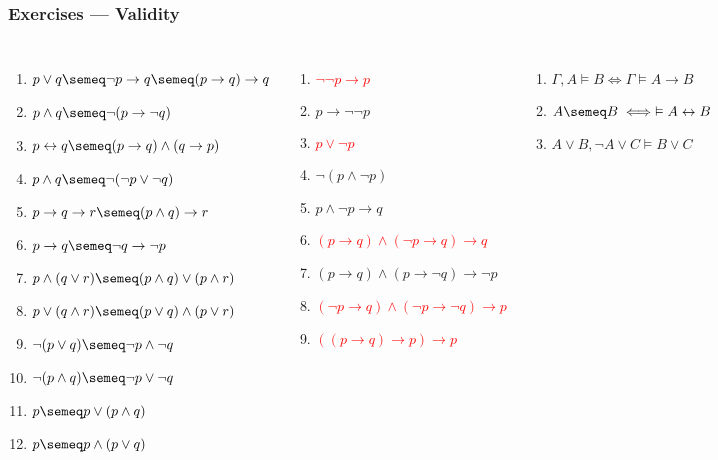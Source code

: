 \documentclass[UTF8,11pt,colorlinks,compress,openany]{beamer}%
\begin{document}
\begin{frame}\frametitle{Exercises --- Validity}
		\begin{columns}
				\begin{enumerate}
					\item \textcolor{green}{$p\vee q\semeq\neg p\to q\semeq(p\to q)\to q$}
					\item \textcolor{green}{$p\wedge q\semeq\neg(p\to\neg q)$}
					\item \textcolor{green}{$p\leftrightarrow q\semeq(p\to q)\wedge(q\to p)$}
					\item $p\wedge q\semeq\neg(\neg p\vee\neg q)$
					\item $p\to q\to r\semeq(p\wedge q)\to r$
					\item $p\to q\semeq\neg q\to\neg p$
					\item $p\wedge(q\vee r)\semeq(p\wedge q)\vee(p\wedge r)$
					\item $p\vee(q\wedge r)\semeq(p\vee q)\wedge(p\vee r)$
					\item $\neg(p\vee q)\semeq\neg p\wedge\neg q$
					\item $\neg(p\wedge q)\semeq\neg p\vee\neg q$
					\item $p\semeq p\vee(p\wedge q)$
					\item $p\semeq p\wedge(p\vee q)$
				\end{enumerate}
				\begin{enumerate}
					\item \textcolor{red}{$\neg\neg p\to p$}
					\item $p\to\neg\neg p$
					\item \textcolor{red}{$p\vee\neg p$}
					\item $\neg(p\wedge\neg p)$
					\item $p\wedge\neg p\to q$
					\item \textcolor{red}{$(p\to q)\wedge(\neg p\to q)\to q$}
					\item $(p\to q)\wedge(p\to\neg q)\to\neg p$
					\item \textcolor{red}{$(\neg p\to q)\wedge(\neg p\to\neg q)\to p$}
					\item \textcolor{red}{$((p\to q)\to p)\to p$}
				\end{enumerate}
				\begin{enumerate}
					\item $\Gamma, A\vDash B\iff\Gamma\vDash A\to B$
					\item $A\semeq B\iff\vDash A\leftrightarrow B$
					\item $A\vee B, \neg A\vee C\vDash B\vee C$
				\end{enumerate}
		\end{columns}
\end{frame}
\end{document}
